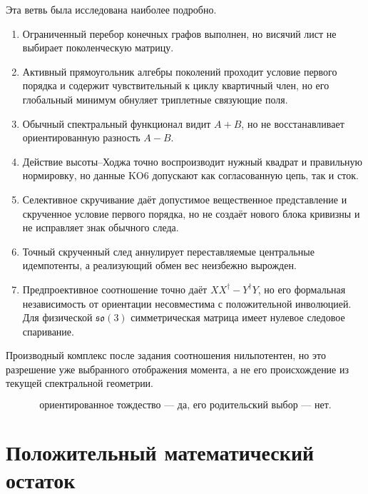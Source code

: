 Эта ветвь была исследована наиболее подробно.
\begin{enumerate}
 \item Ограниченный перебор конечных графов выполнен, но висячий лист не
 выбирает поколенческую матрицу.
 \item Активный прямоугольник алгебры поколений проходит условие первого
 порядка и содержит чувствительный к циклу квартичный член, но его глобальный
 минимум обнуляет триплетные связующие поля.
 \item Обычный спектральный функционал видит \(A+B\), но не восстанавливает
 ориентированную разность \(A-B\).
 \item Действие высоты--Ходжа точно воспроизводит нужный квадрат и правильную
 нормировку, но данные KO6 допускают как согласованную цепь, так и сток.
 \item Селективное скручивание даёт допустимое вещественное представление и
 скрученное условие первого порядка, но не создаёт нового блока кривизны и
 не исправляет знак обычного следа.
 \item Точный скрученный след аннулирует переставляемые центральные
 идемпотенты, а реализующий обмен вес неизбежно вырожден.
 \item Предпроективное соотношение точно даёт
 \(XX^\dagger-Y^\dagger Y\), но его формальная независимость от ориентации
 несовместима с положительной инволюцией. Для физической
 \(\mathfrak{so}(3)\) симметрическая матрица имеет нулевое следовое
 спаривание.
\end{enumerate}

Производный комплекс после задания соотношения нильпотентен, но это
разрешение уже выбранного отображения момента, а не его происхождение из
текущей спектральной геометрии.

\begin{equation}
 \boxed{\text{ориентированное тождество --- да, его родительский выбор --- нет}.}
\end{equation}

\section{Положительный математический остаток}

